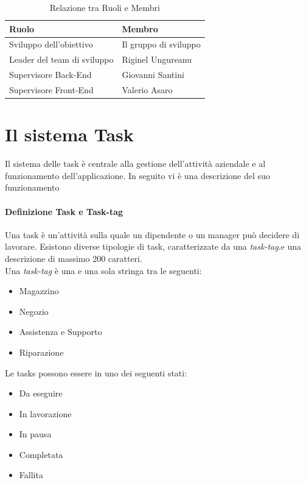 \documentclass{report}
\begin{document}
\begin{table}[!ht]
	\begin{center} %
		\centering
		\begin{tabular}{ |p{4cm}|p{4cm}|  }
			\hline
			\centering Ruolo & \qquad\qquad Membro \\ %
			\hline
			Sviluppo dell'obiettivo & Il gruppo di sviluppo \\
			\hline
			Leader del team di sviluppo & Riginel Ungureanu \\
			\hline
			Supervisore Back-End &
			Giovanni Santini \\
			\hline
			Supervisore Front-End & Valerio Asaro\\
			\hline
		\end{tabular}
		\caption{Relazione tra Ruoli e Membri}
	\end{center}
\end{table}

\chapter{Il sistema Task}
\label{chap:tasks}

Il sistema delle task è centrale alla gestione dell'attività aziendale e al funzionamento dell'applicazione. In seguito vi è una descrizione del suo funzionamento

\subsubsection*{Definizione Task e Task-tag}

Una task è un'attività sulla quale un dipendente o un manager può decidere di lavorare. Esistono diverse tipologie di task, caratterizzate da una \textit{task-tag}.e una descrizione di massimo 200 caratteri.\\
Una \textit{task-tag} è una e una sola stringa tra le seguenti:
\begin{itemize}
	\item Magazzino
	\item Negozio
	\item Assistenza e Supporto
	\item Riparazione
\end{itemize}
Le tasks possono essere in uno dei seguenti stati: 
\begin{itemize}
	\item Da eseguire
	\item In lavorazione
	\item In pausa
	\item Completata
	\item Fallita
\end{itemize}
\end{document}
